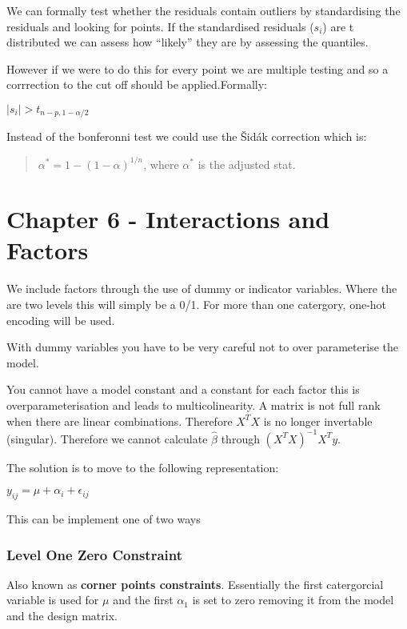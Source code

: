 \documentclass[
  letterpaper,
  DIV=11,
  numbers=noendperiod]{scrreprt}
\begin{document}
We can formally test whether the residuals contain outliers by
standardising the residuals and looking for points. If the standardised
residuals (\(s_i\)) are t distributed we can assess how ``likely'' they
are by assessing the quantiles.

However if we were to do this for every point we are multiple testing
and so a corrrection to the cut off should be applied.Formally:

\(|s_i| > t_{n - p, 1-\alpha/2}\)

Instead of the bonferonni test we could use the Šidák correction which
is:

\begin{quote}
\(\alpha^* = 1 - (1-\alpha)^{1/n}\), where \(\alpha^*\) is the adjusted
stat.
\end{quote}

\hypertarget{chapter-6---interactions-and-factors}{%
\section{Chapter 6 - Interactions and
Factors}\label{chapter-6---interactions-and-factors}}

We include factors through the use of dummy or indicator variables.
Where the are two levels this will simply be a 0/1. For more than one
catergory, one-hot encoding will be used.

With dummy variables you have to be very careful not to over
parameterise the model.

You cannot have a model constant and a constant for each factor this is
overparameterisation and leads to multicolinearity. A matrix is not full
rank when there are linear combinations. Therefore \(X^TX\) is no longer
invertable (singular). Therefore we cannot calculate \(\hat{\beta}\)
through \((X^TX)^{-1}X^T y\).

The solution is to move to the following representation:

\(y_{ij} = \mu + \alpha_i + \epsilon_{ij}\)

This can be implement one of two ways

\hypertarget{level-one-zero-constraint}{%
\subsubsection{Level One Zero
Constraint}\label{level-one-zero-constraint}}

Also known as \textbf{corner points constraints}. Essentially the first
catergorcial variable is used for \(\mu\) and the first \(\alpha_1\) is
set to zero removing it from the model and the design matrix.
\end{document}
